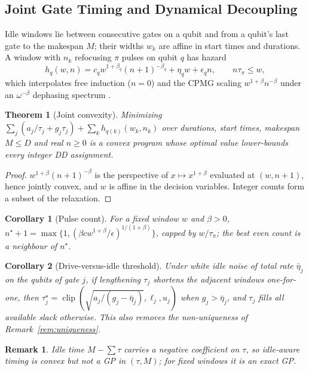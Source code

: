 \documentclass[10pt,letterpaper,journal]{IEEEtran}
\newtheorem{theorem}{Theorem}
\newtheorem{remark}{Remark}
\newtheorem{corollary}{Corollary}
\begin{document}
\subsection{Joint Gate Timing and Dynamical Decoupling}
Idle windows lie between consecutive gates on a qubit and from a qubit's last gate to the makespan $M$; their widths $w_k$ are affine in start times and durations. A window with $n_k$ refocusing $\pi$ pulses on qubit $q$ has hazard
\begin{equation}\label{eq:window}
h_q(w,n)=c_q w^{1+\beta_q}(n+1)^{-\beta_q}+\eta_q w+\epsilon_q n,\qquad n\tau_\pi\le w,
\end{equation}
which interpolates free induction ($n=0$) and the CPMG scaling $w^{1+\beta}n^{-\beta}$ under an $\omega^{-\beta}$ dephasing spectrum \cite{cywinski}.
\begin{theorem}[Joint convexity]\label{th:dd}
Minimizing $\sum_j(a_j/\tau_j+g_j\tau_j)+\sum_k h_{q(k)}(w_k,n_k)$ over durations, start times, makespan $M\le D$ and real $n\ge0$ is a convex program whose optimal value lower-bounds every integer DD assignment.
\end{theorem}
\begin{proof}
$w^{1+\beta}(n+1)^{-\beta}$ is the perspective of $x\mapsto x^{1+\beta}$ evaluated at $(w,n+1)$, hence jointly convex, and $w$ is affine in the decision variables. Integer counts form a subset of the relaxation.
\end{proof}
\begin{corollary}[Pulse count]\label{cor:n}
For a fixed window $w$ and $\beta>0$, $n^\star+1=\max\{1,(\beta c w^{1+\beta}/\epsilon)^{1/(1+\beta)}\}$, capped by $w/\tau_\pi$; the best even count is a neighbour of $n^\star$.
\end{corollary}
\begin{corollary}[Drive-versus-idle threshold]\label{cor:threshold}
Under white idle noise of total rate $\bar\eta_j$ on the qubits of gate $j$, if lengthening $\tau_j$ shortens the adjacent windows one-for-one, then $\tau_j^\star=\operatorname{clip}(\sqrt{a_j/(g_j-\bar\eta_j)},\ell_j,u_j)$ when $g_j>\bar\eta_j$, and $\tau_j$ fills all available slack otherwise. This also removes the non-uniqueness of Remark~\ref{rem:uniqueness}.
\end{corollary}
\begin{remark}\label{rem:notgp}
Idle time $M-\sum\tau$ carries a negative coefficient on $\tau$, so idle-aware timing is convex but not a GP in $(\tau,M)$; for fixed windows it is an exact GP.
\end{remark}
\end{document}
